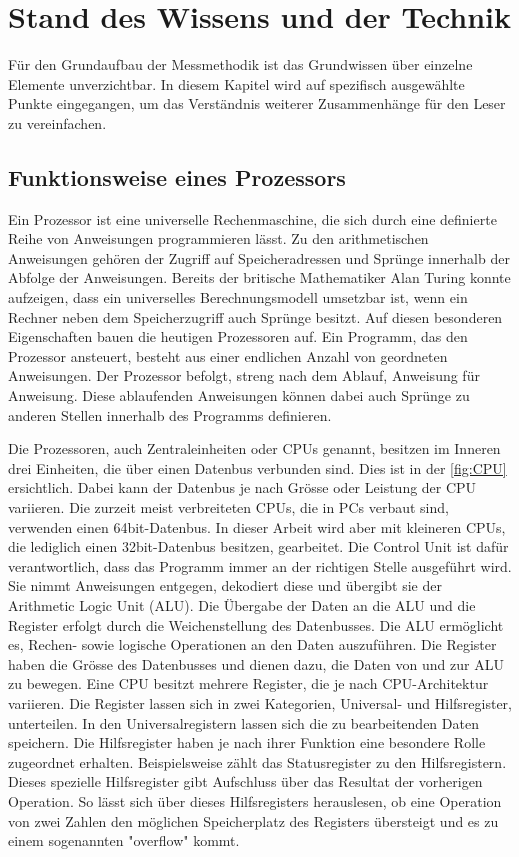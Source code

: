 \chapter{Stand des Wissens und der Technik}
Für den Grundaufbau der Messmethodik ist das Grundwissen über einzelne Elemente unverzichtbar. In diesem Kapitel wird auf spezifisch ausgewählte Punkte eingegangen, um das Verständnis weiterer Zusammenhänge für den Leser zu vereinfachen.


\section{Funktionsweise eines Prozessors}

Ein Prozessor ist eine universelle Rechenmaschine, die sich durch eine definierte Reihe von Anweisungen programmieren lässt. Zu den arithmetischen Anweisungen gehören der Zugriff auf Speicheradressen und Sprünge innerhalb der Abfolge der Anweisungen.
Bereits der britische Mathematiker Alan Turing konnte aufzeigen, dass ein universelles Berechnungsmodell umsetzbar ist, wenn ein Rechner neben dem Speicherzugriff auch Sprünge besitzt\cite{Hoffmann2014l}. Auf diesen besonderen Eigenschaften bauen die heutigen Prozessoren auf. Ein Programm, das den Prozessor ansteuert, besteht aus einer endlichen Anzahl von geordneten Anweisungen. Der Prozessor befolgt, streng nach dem Ablauf, Anweisung für Anweisung. Diese ablaufenden Anweisungen können dabei auch Sprünge zu anderen Stellen innerhalb des Programms definieren.
\par
Die Prozessoren, auch Zentraleinheiten oder CPUs genannt, besitzen im Inneren drei Einheiten, die über einen Datenbus verbunden sind. Dies ist in der \autoref{fig:CPU} ersichtlich. Dabei kann der Datenbus je nach Grösse oder Leistung der CPU variieren. Die zurzeit meist verbreiteten CPUs, die in PCs verbaut sind, verwenden einen 64bit-Datenbus. In dieser Arbeit wird aber mit kleineren CPUs, die lediglich einen 32bit-Datenbus besitzen, gearbeitet. Die Control Unit\cite{patterson2013computer} ist dafür verantwortlich, dass das Programm immer an der richtigen Stelle ausgeführt wird. Sie nimmt Anweisungen entgegen, dekodiert diese und übergibt sie der Arithmetic Logic Unit (ALU). Die Übergabe der Daten an die ALU und die Register erfolgt durch die Weichenstellung des Datenbusses. Die ALU ermöglicht es, Rechen- sowie logische Operationen an den Daten auszuführen. Die Register haben die Grösse des Datenbusses und dienen dazu, die Daten von und zur ALU zu bewegen. Eine CPU besitzt mehrere Register, die je nach CPU-Architektur variieren. Die Register lassen sich in zwei Kategorien, Universal- und Hilfsregister, unterteilen. In den Universalregistern lassen sich die zu bearbeitenden Daten speichern. Die Hilfsregister haben je nach ihrer Funktion eine besondere Rolle zugeordnet erhalten. Beispielsweise zählt das Statusregister zu den Hilfsregistern. Dieses spezielle Hilfsregister gibt Aufschluss über das Resultat der vorherigen Operation. So lässt sich über dieses Hilfsregisters herauslesen, ob eine Operation von zwei Zahlen den möglichen Speicherplatz des Registers übersteigt und es zu einem sogenannten "overflow" kommt.

